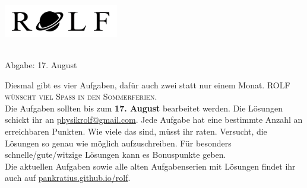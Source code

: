 \documentclass[a4paper]{article}
\begin{document}
	\vspace*{-1cm}
	\parbox{4cm}{\vspace{-0.2cm}\includegraphics[width=5cm]{../images/rolfal.jpg}}
	\parbox{10.6cm}{ \\
			Abgabe: 17. August \\ \vspace*{-.5cm} }
		\vspace{0.5cm}
		
		\thispagestyle{empty}
\begin{framed}
	\noindent
	\scriptsize
	Diesmal gibt es vier Aufgaben, dafür auch zwei statt nur einem Monat. \textsc{ROLF wünscht viel Spaß in den Sommerferien.}\\
	Die Aufgaben sollten bis zum \textbf{17. August} bearbeitet werden. Die Lösungen schickt ihr an \href{mailto:physikrolf@gmail.com}{physikrolf@gmail.com}.
	Jede Aufgabe hat eine bestimmte Anzahl an erreichbaren Punkten. Wie viele das sind, müsst ihr raten. Versucht, die Lösungen so genau wie möglich aufzuschreiben. Für besonders schnelle/gute/witzige Lösungen kann es Bonuspunkte geben.\\ Die aktuellen Aufgaben sowie alle alten Aufgabenserien mit Lösungen findet ihr auch auf \url{pankratius.github.io/rolf}. %
\end{framed}

\noindent
\end{document}
